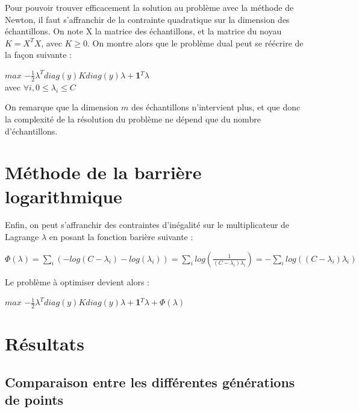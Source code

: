 \documentclass{beamer}
\begin{document}
\begin{frame}
Pour pouvoir trouver efficacement la solution au problème avec la méthode de Newton, il faut s'affranchir de la contrainte quadratique sur la dimension des échantillons. On note X la matrice des échantillons, et la matrice du noyau $K = X^TX$, avec $K \geq 0$. On montre alors que le problème dual peut se réécrire de la façon suivante :\\

                 \begin{center}
                 $max$ $-\frac{1}{2}\lambda^Tdiag(y)Kdiag(y)\lambda+$\textbf{1}$^T\lambda$\\
                 avec $\forall i, 0 \leq \lambda_i \leq C$ 
                 \end{center}

On remarque que la dimension $m$ des échantillons n'intervient plus, et que donc la complexité de la résolution du problème ne dépend que du nombre d'échantillons. 

\section{Méthode de la barrière logarithmique}

Enfin, on peut s'affranchir des contraintes d'inégalité sur le multiplicateur de Lagrange $\lambda$ en posant la fonction barière suivante :\\

          \begin{center}
          $\Phi(\lambda) = \sum_i (- log(C - \lambda_i) - log(\lambda_i)) = \sum_i log(\frac{1}{(C - \lambda_i)\lambda_i}) = - \sum_i log((C - \lambda_i)\lambda_i)$ 
          \end{center}

Le problème à optimiser devient alors :\\

          \begin{center}
          $max$ $-\frac{1}{2}\lambda^Tdiag(y)Kdiag(y)\lambda+$\textbf{1}$^T\lambda + \Phi(\lambda)$\\ 
          \end{center}

\section{Résultats}

\subsection{Comparaison entre les différentes générations de points}


\end{frame}
\end{document}
